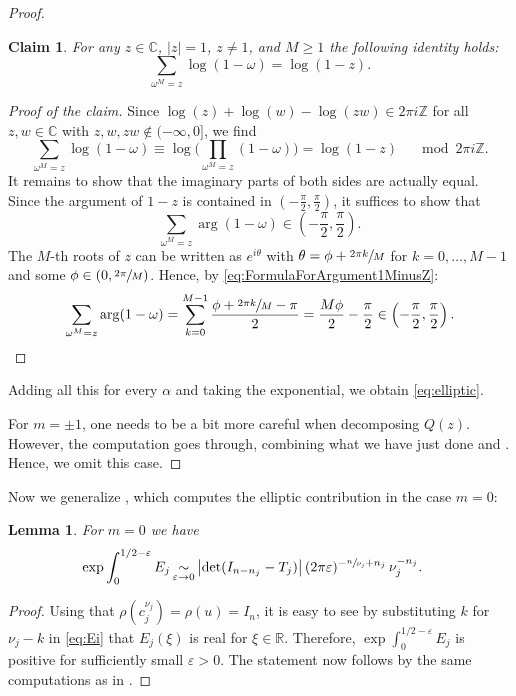 \documentclass[JEP,XML,SOM,Unicode,NoFloatCountersInSection,published]{cedram}
\newcommand{\simm}{\mathop{\sim}\displaylimits}
\theoremstyle{plain}
\newtheorem{lem}[thm]{Lemma}
\newtheorem*{claim}{Claim}
\theoremstyle{definition}
\theoremstyle{remark}
\newcommand{\R}{\mathbb{R}}
\newcommand{\Z}{\mathbb{Z}}
\newcommand{\C}{\mathbb{C}}
\numberwithin{equation}{section}
\begin{document}
\begin{proof}
\begin{claim}
For any $z\in\C$, $|z|=1$, $z\neq1$, and $M\geq1$ the following identity holds:
\begin{equation}
\sum_{\omega^M = z} \log (1-\omega) = \log (1-z).
\end{equation}
\end{claim}
\begin{proof}[Proof of the claim]
Since $\log(z)+\log(w)-\log(zw)\in2\pi i\Z$ for all $z,w\in\C$ with $z,w,zw\not\in(-\infty,0]$, we find
\[
\sum_{\omega^M = z} \log (1-\omega) \equiv \log\Big(\prod_{\omega^M = z} (1-\omega)\Big) = \log (1-z) \quad \mod 2\pi i\Z.
\]
It remains to show that the imaginary parts of both sides are actually equal. Since the argument of $1-z$ is contained in $(-\frac{\pi}{2},\frac{\pi}{2})$, it suffices to show that
\[
\sum_{\omega^M = z}\arg (1-\omega) \in \left(-\frac{\pi}{2},\frac{\pi}{2}\right).
\]
The $M$-th roots of $z$ can be written as $e^{i\theta}$ with $\theta=\phi+\sfrac{2\pi k}{M}$ for $k=0,\ldots,M-1$ and some $\phi\in(0,\sfrac{2\pi}{M})$. Hence, by \cref{eq:FormulaForArgument1MinusZ}:
\begin{equation*}
\sum_{\omega^M = z}\arg (1-\omega) = \sum_{k=0}^{M-1} \frac{\phi+\sfrac{2\pi k}{M}-\pi}{2} = \frac{M\phi}{2}-\frac{\pi}{2} \in \left(-\frac{\pi}{2},\frac{\pi}{2}\right).\qedhere
\end{equation*}
\end{proof}

\noindent
Adding all this for every $\alpha$ and taking the exponential, we obtain \cref{eq:elliptic}.

For $m=\pm 1$, one needs to be a bit more careful when decomposing $Q(z)$. However, the computation goes through, combining what we have just done and \cite[\S 3]{fried1986fuchsian}.
Hence, we omit this case.
\end{proof}

Now we generalize \cite[Lem.\,6]{fried1986fuchsian}, which computes the elliptic contribution in the case $m=0$:

\begin{lem}
\label{lem3}
For $m=0$ we have
\begin{align}\label{eq:elliptic2}
\exp\int_0^{1/2-\varepsilon} E_j &\simm_{\varepsilon \to 0} \left|{\det} (I_{n-n_j} -T_j)\right| (2\pi\varepsilon)^{-\sfrac n {\nu_j} + n_j}\, \nu_j^{-n_j}.
\end{align}
\end{lem}

\begin{proof}
Using that $\rho(c_j^{\nu_j})=\rho(u)=I_n$, it is easy to see by substituting $k$ for $\nu_j-k$ in \cref{eq:Ei} that $E_j(\xi)$ is real for $\xi\in\R$. Therefore, $\exp\int_0^{1/2-\varepsilon}E_j$ is positive for sufficiently small $\varepsilon>0$. The statement now follows by the same computations as in \cite[proof of Lem.\,6]{fried1986fuchsian}.
\end{proof}
\end{document}
